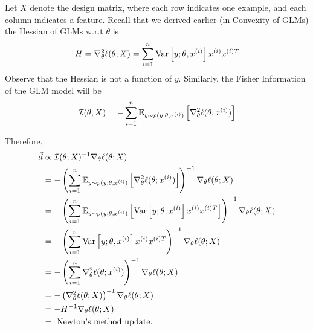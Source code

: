 \begin{answer}
Let $X$ denote the design matrix, where each row indicates one example, and each column indicates a feature. Recall that we derived earlier (in Convexity of GLMs) the Hessian of GLMs w.r.t $\theta$ is
$$H = \nabla_\theta^2\ell(\theta;X) = \sum_{i=1}^{n}\text{Var}\left[ y;\theta, x^{(i)} \right] x^{(i)} x^{(i)T}$$
Observe that the Hessian is not a function of $y$. Similarly, the Fisher Information of the GLM model will be
$$\mathcal{I}(\theta;X) = -\sum_{i=1}^{n} \mathbb{E}_{y\sim p(y;\theta, x^{(i)})} \left[ \nabla_\theta^2 \ell(\theta;x^{(i)}) \right]$$

Therefore,
\begin{align*}
\tilde{d} &\propto \mathcal{I}(\theta;X)^{-1} \nabla_\theta\ell(\theta;X) \\
&= -\left(\sum_{i=1}^{n} \mathbb{E}_{y\sim p(y;\theta, x^{(i)})}\left[ \nabla_\theta^2 \ell(\theta;x^{(i)}) \right] \right)^{-1}\nabla_\theta\ell(\theta;X) \\
&= -\left(\sum_{i=1}^{n} \mathbb{E}_{y\sim p(y;\theta, x^{(i)})}\left[ \text{Var}\left[ y;\theta,x^{(i)} \right] x^{(i)} x^{(i)T} \right] \right)^{-1}\nabla_\theta\ell(\theta;X) \\
&= -\left(\sum_{i=1}^{n} \text{Var}\left[ y;\theta,x^{(i)} \right] x^{(i)} x^{(i)T} \right)^{-1}\nabla_\theta\ell(\theta;X) \\
&= -\left(\sum_{i=1}^{n} \nabla_\theta^2\ell(\theta;x^{(i)}) \right)^{-1}\nabla_\theta\ell(\theta;X) \\
&= -\left(\nabla_\theta^2\ell(\theta;X) \right)^{-1}\nabla_\theta\ell(\theta;X) \\
&= -H^{-1}\nabla_\theta\ell(\theta;X) \\
&= \text{ Newton's method update.}
\end{align*}

\end{answer}
